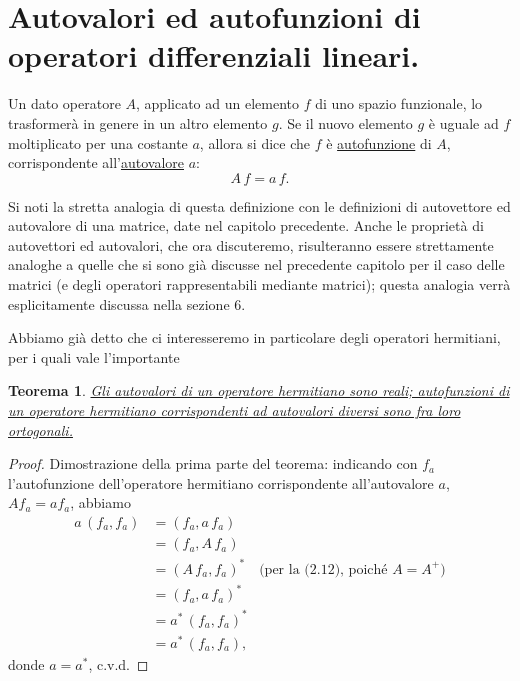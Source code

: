 \documentclass[11pt, a4paper]{book}
\numberwithin{equation}{section}
\newtheorem{teorema}{Teorema}[section]
\begin{document}
\section{Autovalori ed autofunzioni di operatori differenziali lineari.}

Un dato operatore $A$, applicato ad un elemento $f$ di uno spazio
funzionale, lo trasformerà in genere in un altro elemento $g$. Se il
nuovo elemento $g$ è uguale ad $f$ moltiplicato per una costante $a$,
allora si dice che $f$ è \uline{autofunzione} di $A$, corrispondente
all'\uline{autovalore} $a$:
\begin{equation}
A\,f = a\,f.
\end{equation}

Si noti la stretta analogia di questa definizione con le definizioni di
autovettore ed autovalore di una matrice, date nel capitolo precedente.
Anche le proprietà di autovettori ed autovalori, che ora discuteremo,
risulteranno essere strettamente analoghe a quelle che si sono già
discusse nel precedente capitolo per il caso delle matrici (e degli
operatori rappresentabili mediante matrici); questa analogia verrà
esplicitamente discussa nella sezione 6.

Abbiamo già detto che ci interesseremo in particolare degli operatori
hermitiani, per i quali vale l'importante

\begin{teorema}
\uline{Gli autovalori di un operatore hermitiano sono reali; autofunzioni
di un operatore hermitiano corrispondenti ad autovalori diversi sono fra
loro ortogonali.}
\end{teorema}

\begin{proof}
Dimostrazione della prima parte del teorema: indicando con $f_a$
l'autofunzione dell'operatore hermitiano corrispondente all'autovalore
$a$, $Af_a = af_a$, abbiamo
\begin{align*}
a\,(f_a, f_a) &= (f_a, a\,f_a) \\
  &= (f_a, A\,f_a) \\
  &= (A\,f_a, f_a)^* \quad \text{(per la (2.12), poiché }A=A^+\text{)} \\
  &= (f_a, a\,f_a)^* \\
  &= a^*\,(f_a,f_a)^* \\
  &= a^*\,(f_a,f_a),
\end{align*}
donde $a = a^*$, c.v.d.
\end{proof}

\end{document}
